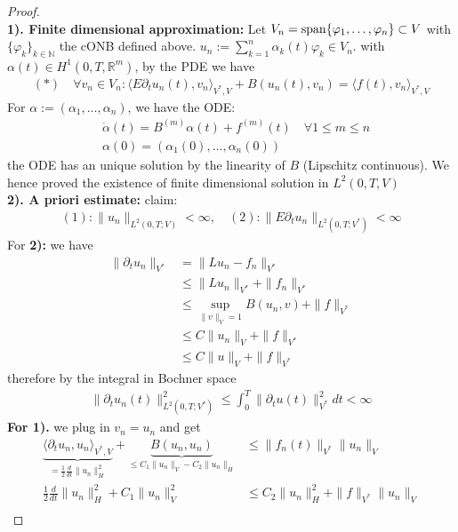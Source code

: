  \begin{proof}\quad\\
 \textbf{1). Finite dimensional approximation:}
 Let $V_n = \operatorname*{span} \{\varphi_1, \dots, \varphi_n \} \subset V $ with $\{\varphi_k\}_{k \in \mathbb{N}}$ the cONB defined above. $u_n:= \sum_{k = 1}^n \alpha_k(t) \varphi_k \in V_n.$ with $\alpha(t) \in H^1(0, T, \mathbb{R}^m)$, by the PDE we have
 \begin{align*}(*) \quad
 	\forall v_n \in V_n: \langle E \partial_t u_n(t), v_n \rangle_{V^*, V} + B(u_n(t), v_n) = \langle f(t), v_n \rangle_{V^*, V} 
 \end{align*}
 For $\alpha := (\alpha_1, \dots, \alpha_n)$, we have the ODE:
 \begin{align*}
 	&\dot{\alpha}(t) = B^{(m)} \alpha(t) + f^{(m)}(t) \quad  \forall 1 \le m \le  n \\
 	&\alpha(0) = (\alpha_1(0),  \dots, \alpha_n(0))
 \end{align*}
 the ODE has an unique solution by the linearity of $B$ (Lipschitz continuous). We hence proved the existence of finite dimensional solution in $L^2(0, T, V) $
 \\
 \textbf{2). A priori estimate:}
 claim:
 \begin{align*}
 	(1):\|u_n\|_{L^2(0, T; V)}< \infty,\quad
 	(2):\|E \partial_t u_n\|_{L^2(0, T; V^*)} < \infty
 \end{align*}
 For \textbf{2):} we have
 \begin{align*}
 	\| \partial_t u_n\|_{V^*}  &= \|Lu_n - f_n\|_{V^*}\\
 	&\le \|Lu_n\|_{V^*} + \|f_n\|_{V^*}\\
 	&\le  \sup_{\|v\|_V = 1}B(u_n, v)  + \|f\|_{V^*}\\
 	&\le C \|u_n\|_V + \|f\|_{V^*}\\
 	&\le C \|u\|_V + \|f\|_{V^*}
 \end{align*}
 therefore by the integral in Bochner space
 \begin{align*}
 	\|\partial_t u_n(t)\|_{L^2(0, T; V^*)}^2  \le  \int_0^T \|\partial_t u(t)\|_{V^*}^2 dt < \infty
 \end{align*}
 \textbf{For 1).}
 we plug in $v_n = u_n$ and get 
 \begin{align*}
 	\underbrace{\langle \partial_t u_n, u_n \rangle_{V^*, V}}_{ = \frac{1}{2}\frac{d}{dt}\|u_n\|_H^2} + \underbrace{B(u_n, u_n)}_{\le C_1 \|u_n\|_V - C_2 \|u_n\|_H} &\le \|f_n(t)\|_{V^*}\|u_n\|_V\\
 	\frac{1}{2}\frac{d}{dt}\|u_n\|_H^2 + C_1 \|u_n\|_V^2 &\le C_2 \|u_n\|_H^2 + \|f\|_{V^*}\|u_n\|_V\\

\end{align*}
\end{proof}
